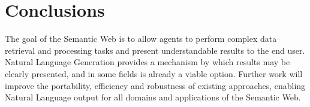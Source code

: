 \documentclass{acm_proc_article-sp}
\begin{document}
\section{Conclusions}
The goal of the Semantic Web is to allow agents to perform complex data retrieval and processing tasks and present understandable results to the end user. Natural Language Generation provides a mechanism by which results may be clearly presented, and in some fields is already a viable option. Further work will improve the portability, efficiency and robustness of existing approaches, enabling Natural Language output for all domains and applications of the Semantic Web.

\newpage



\balancecolumns
\end{document}
